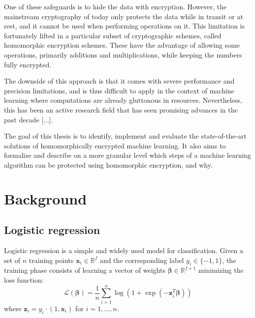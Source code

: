 \documentclass[a4paper,11pt,oneside]{report}
\begin{document}
One of these safeguards is to hide the data with encryption. However, the mainstream cryptography of today only protects the data while in transit or at rest, and it cannot be used when performing operations on it. This limitation is fortunately lifted in a particular subset of cryptographic schemes, called homomorphic encryption schemes. These have the advantage of allowing some operations, primarily additions and multiplications, while keeping the numbers fully encrypted.

The downside of this approach is that it comes with severe performance and precision limitations, and is thus difficult to apply in the context of machine learning where computations are already gluttonous in resources. Nevertheless, this has been an active research field that has seen promising advances in the past decade [...].

The goal of this thesis is to identify, implement and evaluate the state-of-the-art solutions of homomorphically encrypted machine learning. It also aims to formalize and describe on a more granular level which steps of a machine learning algorithm can be protected using homomorphic encryption, and why.


\chapter{Background}



\section{Logistic regression}

Logistic regression is a simple and widely used model for classification. Given a set of $n$ training points $\mathbf{x}_i \in \mathbb{R}^f$ and the corresponding label $y_i \in \{-1,1\}$, the training phase consists of learning a vector of weights $\boldsymbol\beta \in \mathbb{R}^{f+1}$ minimizing the loss function:
\begin{equation}\label{logistic_reg}
    \mathcal{L}(\boldsymbol\beta) = \frac{1}{n} \sum_{i=1}^{n} \log(1 + \exp(-\mathbf{z}_i^T \boldsymbol\beta)) 
\end{equation}
where $\mathbf{z}_i = y_i \cdot (1, \mathbf{x}_i)$ for $i=1,...,n$.
\end{document}
